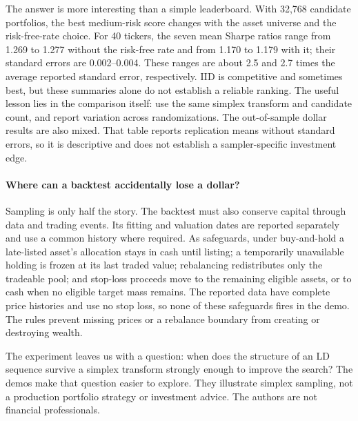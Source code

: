 The answer is more interesting than a simple leaderboard.  With 32,768
candidate portfolios, the best medium-risk score changes with the asset
universe and the risk-free-rate choice.  For 40 tickers, the seven mean
Sharpe ratios range from 1.269 to 1.277 without the risk-free rate and from
1.170 to 1.179 with it; their standard errors are 0.002--0.004.  These ranges
are about 2.5 and 2.7 times the average reported standard error, respectively.
IID is competitive and sometimes best, but these summaries alone do not
establish a reliable ranking.  The useful lesson lies in the comparison itself: use the same simplex
transform and candidate count, and report variation across randomizations.  The
out-of-sample dollar results are also mixed.  That table reports replication
means without standard errors, so it is descriptive and does not establish a
sampler-specific investment edge.

\paragraph{Where can a backtest accidentally lose a dollar?}
Sampling is only half the story.  The backtest must also conserve capital
through data and trading events.  Its fitting and valuation dates are reported separately and use a common
history where required.  As safeguards, under buy-and-hold a late-listed asset's allocation
stays in cash until listing; a temporarily unavailable holding is frozen at
its last traded value; rebalancing redistributes only the tradeable pool; and
stop-loss proceeds move to the remaining eligible assets, or to cash when no
eligible target mass remains.  The reported data have complete price histories
and use no stop loss, so none of these safeguards fires in the demo.  The rules
prevent missing prices or a rebalance boundary from creating or destroying wealth.

The experiment leaves us with a question: when
does the structure of an LD sequence survive a simplex transform strongly
enough to improve the search?  The demos make that
question easier to explore.  They illustrate simplex sampling,
not a production portfolio strategy or investment advice.  The authors are
not financial professionals.
